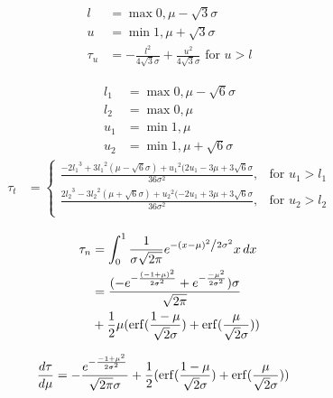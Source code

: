 \begin{align}
l &= \max{0,\mu -\sqrt{3} \sigma}\\
u &= \min{1,\mu+\sqrt{3}\sigma}\\
\tau_u &= -\frac{l^2}{4\sqrt{3}\sigma}+ \frac{u^2}{4\sqrt{3}\sigma} \textrm{  for    }  u>l
\end{align}

\begin{align}
l_1 &= \max{0,\mu-\sqrt{6}\sigma}\\ \nonumber
l_2 &= \max{0,\mu}\\ \nonumber
u_1 &= \min{1,\mu}\\ \nonumber
u_2 &= \min{1,\mu+\sqrt{6}\sigma} \nonumber
\end{align}
\begin{align}
\tau_t &=  \left\{
\begin{array}{ll}
\frac{-2{l_1}^3+3{l_1}^2(\mu-\sqrt{6}\sigma)+{u_1}^2(2u_1 - 3\mu+3\sqrt{6}\sigma}{36\sigma^2}, &   \textrm{for     } u_1 > l_1\\
\frac{2{l_2}^3-3{l_2}^2(\mu+\sqrt{6}\sigma)+{u_2}^2(-2u_1 + 3\mu+3\sqrt{6}\sigma}{36\sigma^2}, &   \textrm{for     } u_2 > l_2\\
\end{array} 
\right.
\end{align}

\begin{align} \nonumber
\tau_n &= \int_0^1\frac{1}{{\sigma \sqrt {2\pi } }}e^{{{ - \left( {x - \mu } \right)^2 } \mathord{\left/ {\vphantom {{ - \left( {x - \mu } \right)^2 } {2\sigma ^2 }}} \right. \kern-\nulldelimiterspace} {2\sigma ^2 }}} x \, dx\\ \nonumber
&= \frac{(-e^{-\frac{(-1+\mu)^2}{2\sigma^2}}+e^{-\frac{-\mu^2}{2\sigma^2}})\sigma}{\sqrt{2\pi}}\\ 
&+ \frac{1}{2}\mu(\erf(\frac{1-\mu}{\sqrt{2}\sigma})+\erf(\frac{\mu}{\sqrt{2}\sigma})) 
\end{align}



\begin{align} 
\frac{d\tau}{d\mu} &= -\frac{e^{-\frac{{-1+\mu}^2}{2\sigma^2}}}{\sqrt{2\pi}\sigma} + \frac{1}{2}(\operatorname{erf}(\frac{1-\mu}{\sqrt{2}\sigma})+\operatorname{erf}(\frac{\mu}{\sqrt{2}\sigma})) 
\end{align}






